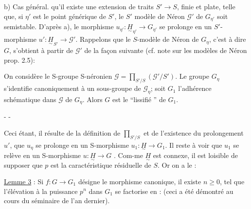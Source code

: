 b) Cas général.
qu'il existe une extension de traits $S'\longrightarrow S$, finie et plate, telle que, si $\eta'$ est le point générique de $S'$, le $S'$ modèle de Néron $\mathcal G'$ de $G_{\eta'}$ soit semi\inserted{-}stable. D'après a), le morphisme $u_{\eta'}:\underset{\sim}{H}_{\eta'}\longrightarrow G_{\eta'}$ se prolonge en un $S'$-morphisme $u':\underset{\sim}{H}_{S'}\longrightarrow\mathcal G'$. Rappelons que le $S$-modèle de Néron de $G_\eta$, c'est à dire $G$, s'obtient à partir de $\mathcal G'$ de la façon suivante (cf. note sur les modèles de Néron prop. 2.5):

On considère le S-groupe S-néronien $\mathcal G=\prod_{S'/S}(\mathcal G'/S')$. Le groupe $G_\eta$ s'identifie canoniquement à un sous-groupe de $\mathcal G_\eta$; soit $G_1$ l'adhérence schématique dans $\mathcal G$ de $G_\eta$. Alors $G$ est le ``lissifié '' de $G_1$.


-  -

Ceci étant, il résulte de la définition de $\prod_{S'/S}$ et de l'existence du prolongement $u'$, que $u_\eta$ se prolonge en un S-morphisme $u_1:\underset{\sim}{H}\longrightarrow G_1$. Il reste à voir que $u_1$ se relève en un S-morphisme $u:\underset{\sim}{H}\longrightarrow G$ . Com-me $\underset{\sim}{H}$ est connexe, il est loisible de supposer que $p$ est la caractéristique résiduelle de $S$. Or on a le :

\uline{Lemme 3} : Si $f:G\longrightarrow G_1$ désigne le morphisme canonique,  il existe $n\geq0$, tel que l'élévation à la puissance $p^n$ dans $G_1$ se factorise en :
(ceci a été démontré au cours du séminaire de l'an dernier).

